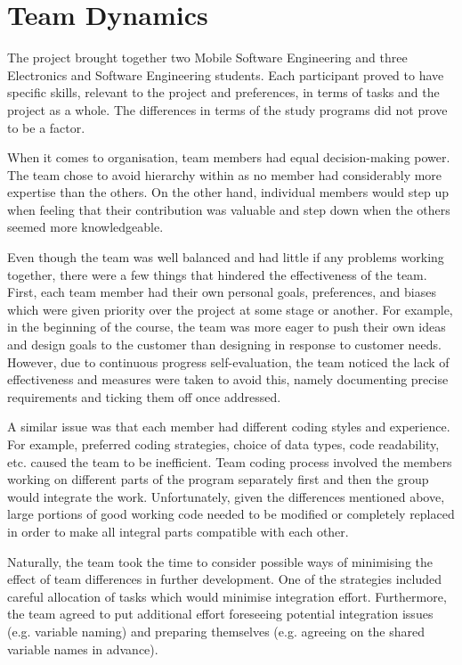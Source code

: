 \documentclass{l3proj}
\begin{document}
\section{Team Dynamics}
\label{sec:teamdynamics}

The project brought together two Mobile Software Engineering and three Electronics and Software Engineering students. Each participant proved to have specific skills, relevant to the project and preferences, in terms of tasks and the project as a whole. The differences in terms of the study programs did not prove to be a factor.
 
When it comes to organisation, team members had equal decision-making power. The team chose to avoid hierarchy within as no member had considerably more expertise than the others. On the other hand, individual members would step up when feeling that their contribution was valuable and step down when the others seemed more knowledgeable. 

Even though the team was well balanced and had little if any problems working together, there were a few things that hindered the effectiveness of the team. First, each team member had their own personal goals, preferences, and biases which were given priority over the project at some stage or another. For example, in the beginning of the course, the team was more eager to push their own ideas and design goals to the customer than designing in response to customer needs. However, due to continuous progress self-evaluation, the team noticed the lack of effectiveness and measures were taken to avoid this, namely documenting precise requirements and ticking them off once addressed. 

A similar issue was that each member had different coding styles and experience. For example, preferred coding strategies, choice of data types, code readability, etc. caused the team to be inefficient. Team coding process involved the members working on different parts of the program separately first and then the group would integrate the work. Unfortunately, given the differences mentioned above, large portions of good working code needed to be modified or completely replaced in order to make all integral parts compatible with each other. 

Naturally, the team took the time to consider possible ways of minimising the effect of team differences in further development. One of the strategies included careful allocation of tasks which would minimise integration effort. Furthermore, the team agreed to put additional effort foreseeing potential integration issues (e.g. variable naming) and preparing themselves (e.g. agreeing on the shared variable names in advance).
\end{document}
